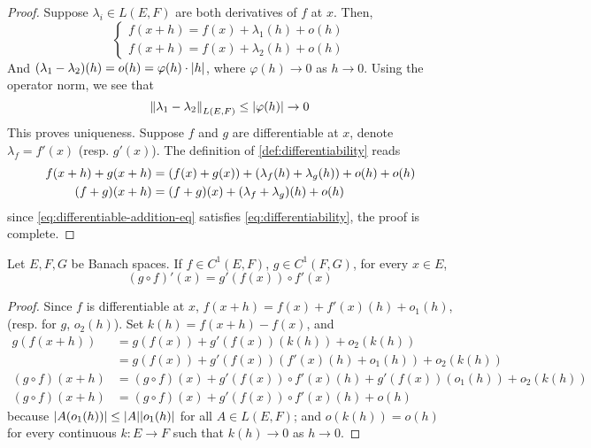 \documentclass[../main-manifolds.tex]{subfiles}
\begin{document}
\begin{proof}
    Suppose $\lambda_i\in L(E,F)$ are both derivatives of $f$ at $x$. Then,
    \[
        \begin{cases}
        f(x+h) = f(x) + \lambda_1(h) + o(h)\\
        f(x+h) = f(x) + \lambda_2(h) + o(h)
        \end{cases}
    \]
    And $(\lambda_1 - \lambda_2)(h) = o(h) = \varphi(h)\cdot\abs{h}$, where $\varphi(h)\to 0$ as $h\to 0$. Using the operator norm, we see that
    \[
        \norm{\lambda_1-\lambda_2}_{L(E,F)}\leq \abs{\varphi(h)}\to 0
    \]
    This proves uniqueness. Suppose $f$ and $g$ are differentiable at $x$, denote $\lambda_f = f'(x)$ (resp. $g'(x)$). The definition of \cref{def:differentiability} reads
    \begin{align}
        f(x+h) + g(x+h) &= \qty(f(x) + g(x)) + \qty(\lambda_f(h) + \lambda_g(h)) + o(h) + o(h)\nonumber\\
        (f + g)(x+h) &= (f+g)(x) + (\lambda_f + \lambda_g)(h) + o(h)\label{eq:differentiable-addition-eq}
    \end{align}
    since \cref{eq:differentiable-addition-eq} satisfies \cref{eq:differentiability}, the proof is complete.
\end{proof}
\begin{wts}\label{prop:chain-rule}
    Let $E, F, G$ be Banach spaces. If $f\in C^1(E,F)$, $g\in C^1(F,G)$, for every $x\in E$,
    \begin{equation}\label{eq:chain-rule}
        (g\circ f)'(x) = g'(f(x))\circ f'(x)
    \end{equation}
\end{wts}
\begin{proof}
    Since $f$ is differentiable at $x$, $f(x+h) = f(x) + f'(x)(h) + o_1(h)$, (resp. for $g$, $o_2(h)$). Set $k(h) = f(x+h) - f(x)$, and 
    \begin{align*}
        g(f(x+h)) &= g(f(x)) + g'(f(x))(k(h)) + o_2(k(h))\\
        &= g(f(x)) + g'(f(x))(f'(x)(h) + o_1(h)) + o_2(k(h))\\
        (g\circ f)(x+h) &= (g\circ f)(x) + g'(f(x))\circ f'(x)(h) + g'(f(x))(o_1(h)) + o_2(k(h))\\
        (g\circ f)(x+h) &= (g\circ f)(x) + g'(f(x))\circ f'(x)(h) + o(h)
    \end{align*}
    because $\abs{A(o_1(h))}\leq \abs{A}\abs{o_1(h)}$ for all $A\in L(E,F)$; and $o(k(h)) = o(h)$ for every continuous $k: E\to F$ such that $k(h)\to 0$ as $h\to 0$.
\end{proof}
\end{document}
